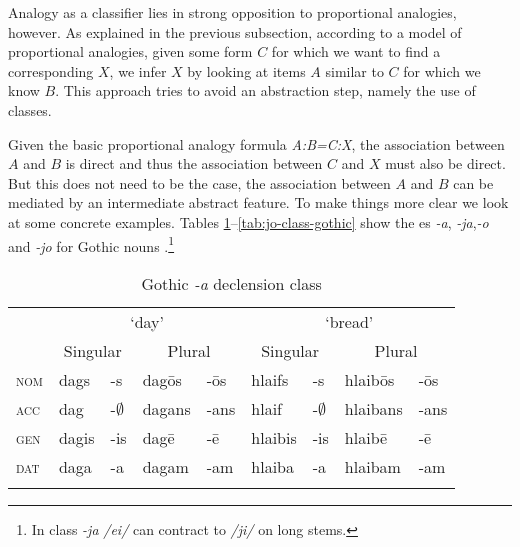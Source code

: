 Analogy as a classifier lies in strong opposition to proportional analogies, however. As explained in the previous subsection, according to a model of proportional analogies, given some form $C$ for which we want to find a corresponding $X$, we infer $X$ by looking at items $A$ similar to $C$ for which we know $B$. This approach tries to avoid an abstraction step, namely the use of classes.
 
Given the basic proportional analogy formula \textit{A:B=C:X}, the association between $A$ and $B$ is direct and thus the association between $C$ and $X$ must also be direct. But this does not need to be the case, the association between $A$ and $B$ can be mediated by an intermediate abstract feature. To make things more clear we look at some concrete examples. Tables \ref{tab:a-class-gothic}--\ref{tab:jo-class-gothic} show the es \textit{-a}, \textit{-ja},\textit{-o} and \textit{-jo} for Gothic nouns \autocite{Braune.1895}.\footnote{In class \textit{-ja} \textit{/ei/} can contract to \textit{/ji/} on long stems.}

\begin{table}[h]
    \centering
    \caption{Gothic \textit{-a} declension class}\label{tab:a-class-gothic}
    \begin{tabular}{lllllllll}
      \lsptoprule
      & \multicolumn{4}{c}{`day'} & \multicolumn{4}{c}{`bread'}\\
      & \multicolumn{2}{c}{Singular} & \multicolumn{2}{c}{Plural} & \multicolumn{2}{c}{Singular} & \multicolumn{2}{c}{Plural} \\
      \midrule

      \textsc{nom} & dags  & -s           & dagōs  & -ōs  & hlaifs  & -s           & hlaibōs  & -ōs  \\
      \textsc{acc} & dag   & -$\emptyset$ & dagans & -ans & hlaif   & -$\emptyset$ & hlaibans & -ans \\
      \textsc{gen} & dagis & -is          & dagē   & -ē   & hlaibis & -is          & hlaibē   & -ē   \\
      \textsc{dat} & daga  & -a           & dagam  & -am  & hlaiba  & -a           & hlaibam  & -am  \\
      \lspbottomrule
  \end{tabular}
\end{table}

